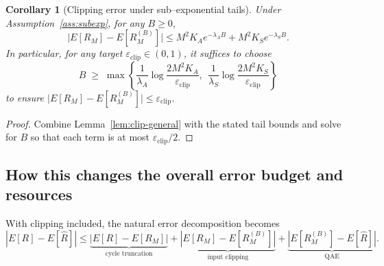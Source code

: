 \documentclass[11pt]{article}
\newtheorem{corollary}{Corollary}
\begin{document}
\begin{corollary}[Clipping error under sub--exponential tails]
\label{cor:clip-subexp}
Under Assumption~\ref{ass:subexp}, for any $B\ge 0$,
\[
\bigl|E[R_M]-E[R_M^{(B)}]\bigr|
\le
M^2 K_A e^{-\lambda_A B} + M^2 K_S e^{-\lambda_S B}.
\]
In particular, for any target $\varepsilon_{\mathrm{clip}}\in(0,1)$, it suffices to choose
\begin{equation}
\label{eq:B-choice-subexp}
B \;\ge\;
\max\!\left\{
\frac{1}{\lambda_A}\log\frac{2M^2K_A}{\varepsilon_{\mathrm{clip}}},
\ \ 
\frac{1}{\lambda_S}\log\frac{2M^2K_S}{\varepsilon_{\mathrm{clip}}}
\right\}
\end{equation}
to ensure $\bigl|E[R_M]-E[R_M^{(B)}]\bigr|\le \varepsilon_{\mathrm{clip}}$.
\end{corollary}

\begin{proof}
Combine Lemma~\ref{lem:clip-general} with the stated tail bounds and solve for
$B$ so that each term is at most $\varepsilon_{\mathrm{clip}}/2$.
\end{proof}

\subsection{How this changes the overall error budget and resources}

With clipping included, the natural error decomposition becomes
\[
|E[R] - E[\hat R]|
\le 
\underbrace{|E[R] - E[R_M]|}_{\text{cycle truncation}}
+ \underbrace{|E[R_M] - E[R_M^{(B)}]|}_{\text{input clipping}}
+ \underbrace{|E[R_M^{(B)}] - E[\hat R]|}_{\text{QAE}}.
\]
\end{document}
